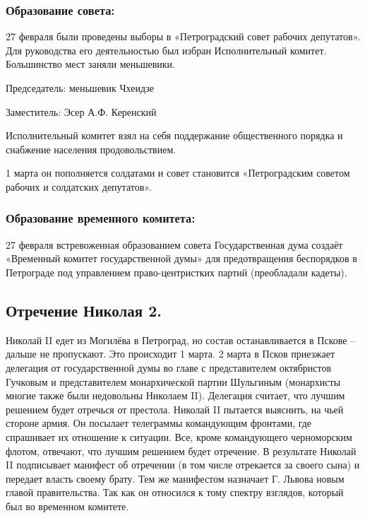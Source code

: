 \subsubsection{\textbf{Образование совета:}}

27 февраля были проведены выборы в «Петроградский совет рабочих депутатов». Для руководства его деятельностью был избран Исполнительный комитет. Большинство мест заняли меньшевики.

Председатель: меньшевик Чхеидзе

Заместитель: Эсер А.Ф. Керенский

Исполнительный комитет взял на себя поддержание общественного порядка и снабжение населения продовольствием.

1 марта он пополняется солдатами и совет становится «Петроградским советом рабочих и солдатских депутатов».

\subsubsection{\textbf{Образование временного комитета:}}

27 февраля встревоженная образованием совета Государственная дума создаёт «Временный комитет государственной думы» для предотвращения беспорядков в Петрограде под управлением право-центристких партий (преобладали кадеты). 

\subsection{Отречение Николая 2.}

Николай II едет из Могилёва в Петроград, но состав останавливается в Пскове – дальше не пропускают. Это происходит 1 марта. 2 марта в Псков приезжает делегация от государственной думы во главе с представителем октябристов Гучковым и представителем монархической партии Шульгиным (монархисты многие также были недовольны Николаем II). Делегация считает, что лучшим решением будет отречься от престола. Николай II пытается выяснить, на чьей стороне армия. Он посылает телеграммы командующим фронтами, где спрашивает их отношение к ситуации. Все, кроме командующего черноморским флотом, отвечают, что лучшим решением будет отречение. В результате Николай II подписывает манифест об отречении (в том числе отрекается за своего сына) и передает власть своему брату. Тем же манифестом назначает Г. Львова новым главой правительства. Так как он относился к тому спектру взглядов, который был во временном комитете.

